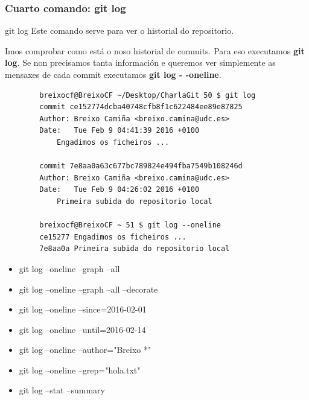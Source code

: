 \begin{frame}[fragile]
	\frametitle{Cuarto comando: git log}
	\begin{block}{git log}
	Este comando serve para ver o historial do repositorio.
	\end{block}
	\scriptsize
	Imos comprobar como está o noso historial de commits. Para eso executamos \textbf{git log}. Se non precisamos tanta información e queremos ver simplemente as mensaxes de cada commit executamos \textbf{git log - -oneline}.
	\tiny 
	
	\begin{multicols}{2}
	\begin{verbatim}
		breixocf@BreixoCF ~/Desktop/CharlaGit 50 $ git log
		commit ce152774dcba40748cfb8f1c622484ee89e87825
		Author: Breixo Camiña <breixo.camina@udc.es>
		Date:   Tue Feb 9 04:41:39 2016 +0100
		    Engadimos os ficheiros ...
		
		commit 7e8aa0a63c677bc789824e494fba7549b108246d
		Author: Breixo Camiña <breixo.camina@udc.es>
		Date:   Tue Feb 9 04:26:02 2016 +0100
		    Primeira subida do repositorio local
		    
		breixocf@BreixoCF ~ 51 $ git log --oneline
		ce15277 Engadimos os ficheiros ...
		7e8aa0a Primeira subida do repositorio local
		\end{verbatim}
		\columnbreak
		\tiny 
		\begin{itemize}
		\item git log --oneline --graph --all
		\item git log --oneline --graph --all --decorate
		\item git log --oneline --since=2016-02-01
		\item git log --oneline --until=2016-02-14
		\item git log --oneline --author="Breixo *"
		\item git log --oneline --grep="hola.txt"
		\item git log --stat --summary
		\end{itemize}
	\end{multicols}
	
\end{frame}

